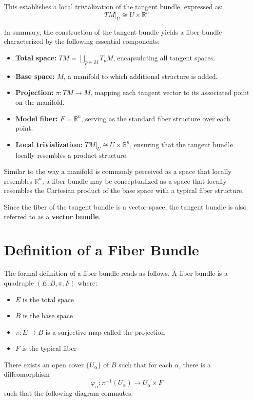 This establishes a local trivialization of the tangent bundle, expressed as:
\[
TM|_U \cong U \times \mathbb{R}^n
\]

In summary, the construction of the tangent bundle yields a fiber bundle characterized by the following essential components:
\begin{itemize}
  \item \textbf{Total space:} \( TM = \bigsqcup_{p \in M} T_pM \), encapsulating all tangent spaces.
  \item \textbf{Base space:} \( M \), a manifold to which additional structure is added.
  \item \textbf{Projection:} \( \pi: TM \to M \), mapping each tangent vector to its associated point on the manifold.
  \item \textbf{Model fiber:} \( F = \mathbb{R}^n \), serving as the standard fiber structure over each point.
  \item \textbf{Local trivialization:} \( TM|_U \cong U \times \mathbb{R}^n \), ensuring that the tangent bundle locally resembles a product structure.
\end{itemize}

 Similar to the way a manifold is commonly perceived as a space that locally resembles \( \mathbb{R}^n \), a fiber bundle may be conceptualized as a space that locally resembles the Cartesian product of the base space with a typical fiber structure. 

Since the fiber of the tangent bundle is a vector space, the tangent bundle is also referred to as a \textbf{vector bundle}.

\section{Definition of a Fiber Bundle}

The formal definition of a fiber bundle reads as follows\cite{FredericSchullerTopologicalmanifoldsmanifoldbundlesLec06FredericSchuller2015}.
A fiber bundle is a quadruple $(E, B, \pi, F)$ where:
\begin{itemize}
  \item $E$ is the total space
  \item $B$ is the base space
  \item $\pi: E \to B$ is a surjective map called the projection
  \item $F$ is the typical fiber
\end{itemize}

There exists an open cover $\{U_\alpha\}$ of $B$ such that for each $\alpha$, there is a diffeomorphism
\[
\varphi_\alpha: \pi^{-1}(U_\alpha) \to U_\alpha \times F
\]
such that the following diagram commutes:



